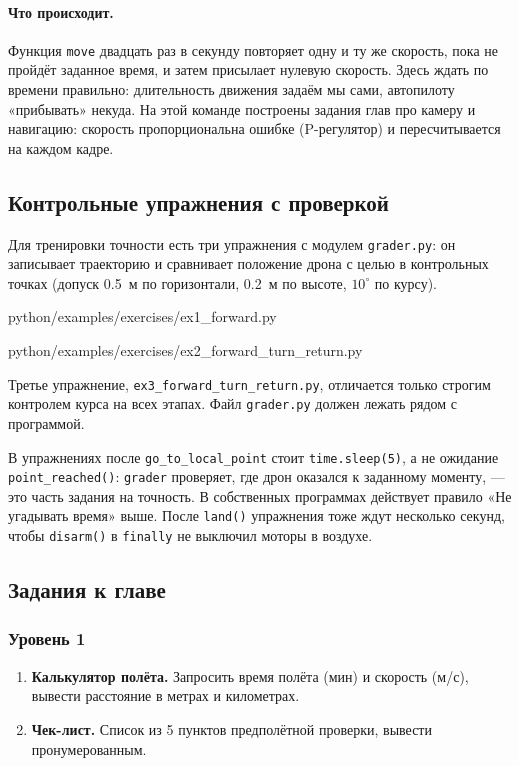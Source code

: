 \paragraph{Что происходит.} Функция \verb|move| двадцать раз в секунду повторяет одну и ту же скорость, пока не пройдёт заданное время, и затем присылает нулевую скорость. Здесь ждать по времени правильно: длительность движения задаём мы сами, автопилоту «прибывать» некуда. На этой команде построены задания глав про камеру и навигацию: скорость пропорциональна ошибке (P-регулятор) и пересчитывается на каждом кадре.
\subsection{Контрольные упражнения с проверкой}

Для тренировки точности есть три упражнения с модулем \texttt{grader.py}: он записывает траекторию и сравнивает положение дрона с целью в контрольных точках (допуск 0.5~м по горизонтали, 0.2~м по высоте, $10^\circ$ по курсу).

\begin{codefile}[python]{python/examples/exercises/ex1_forward.py}
\end{codefile}

\begin{codefile}[python]{python/examples/exercises/ex2_forward_turn_return.py}
\end{codefile}

Третье упражнение, \texttt{ex3\_forward\_turn\_return.py}, отличается только строгим контролем курса на всех этапах. Файл \texttt{grader.py} должен лежать рядом с программой.

\begin{infobox}
В упражнениях после \verb|go_to_local_point| стоит \verb|time.sleep(5)|, а не ожидание \verb|point_reached()|: \texttt{grader} проверяет, где дрон оказался к заданному моменту, --- это часть задания на точность. В собственных программах действует правило «Не угадывать время» выше. После \verb|land()| упражнения тоже ждут несколько секунд, чтобы \verb|disarm()| в \verb|finally| не выключил моторы в воздухе.
\end{infobox}

\subsection{Задания к главе}

\subsubsection*{Уровень 1}
\begin{enumerate}
    \item \textbf{Калькулятор полёта.} Запросить время полёта (мин) и скорость (м/с), вывести расстояние в метрах и километрах.
    \item \textbf{Чек-лист.} Список из 5 пунктов предполётной проверки, вывести пронумерованным.
\end{enumerate}

